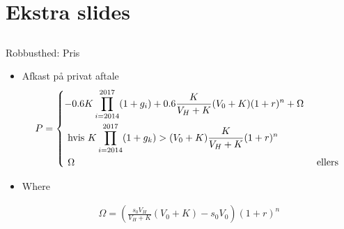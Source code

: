 \documentclass{beamer}
\begin{document}
\section{Ekstra slides}
\subsection{}

\begin{frame}{Robbusthed: Pris}

\begin{itemize}
	\item Afkast på privat aftale
\small
\begin{align}
&P= 
\begin{dcases} 
-0.6K \prod_{i=2014}^{2017} (1+g_i)+0.6\frac{K}{V_H+K}(V_0+K)(1+r)^n +\Omega \\ 
\text{     hvis    } K\prod_{i=2014}^{2017}(1+g_k)>(V_0+K)\frac{K}{V_H+K}(1+r)^n \nonumber \\
\text{ $\Omega$} &\text{  ellers } \nonumber
\end {dcases} \\
\end{align}
\item Where 

\begin{align}
	\Omega=\left(\frac{s_0 V_H}{V_H+K}(V_0+K)-s_0V_0 \right) (1+r)^n \nonumber
\end{align}

\end{itemize}

\end{frame}
\end{document}
